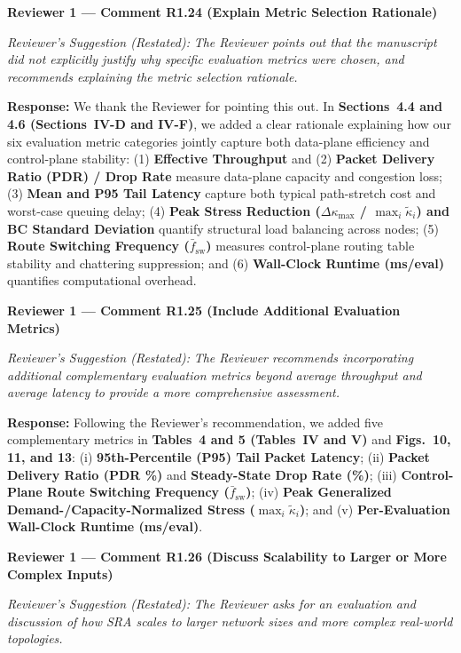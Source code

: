 \documentclass[11pt,a4paper]{article}
\newcommand{\cbox}[2]{%
  \vspace{0.6em}\noindent\textbf{#1}\par\smallskip
  \noindent\textit{Reviewer's Suggestion (Restated):} \textit{#2}\par\smallskip
}
\begin{document}
\hrulefill

\cbox{Reviewer 1 --- Comment R1.24 (Explain Metric Selection Rationale)}{The Reviewer points out that the manuscript did not explicitly justify why specific evaluation metrics were chosen, and recommends explaining the metric selection rationale.}

\noindent\textbf{Response:} We thank the Reviewer for pointing this out. In \textbf{Sections~4.4 and 4.6 (Sections~IV-D and IV-F)}, we added a clear rationale explaining how our six evaluation metric categories jointly capture both data-plane efficiency and control-plane stability: (1) \textbf{Effective Throughput} and (2) \textbf{Packet Delivery Ratio (PDR) / Drop Rate} measure data-plane capacity and congestion loss; (3) \textbf{Mean and P95 Tail Latency} capture both typical path-stretch cost and worst-case queuing delay; (4) \textbf{Peak Stress Reduction ($\Delta\kappa_{\max}$ / $\max_i\widetilde{\kappa}_i$) and BC Standard Deviation} quantify structural load balancing across nodes; (5) \textbf{Route Switching Frequency ($\bar{f}_{\text{sw}}$)} measures control-plane routing table stability and chattering suppression; and (6) \textbf{Wall-Clock Runtime (ms/eval)} quantifies computational overhead.

\hrulefill

\cbox{Reviewer 1 --- Comment R1.25 (Include Additional Evaluation Metrics)}{The Reviewer recommends incorporating additional complementary evaluation metrics beyond average throughput and average latency to provide a more comprehensive assessment.}

\noindent\textbf{Response:} Following the Reviewer's recommendation, we added five complementary metrics in \textbf{Tables~4 and 5 (Tables~IV and V)} and \textbf{Figs.~10, 11, and 13}: (i) \textbf{95th-Percentile (P95) Tail Packet Latency}; (ii) \textbf{Packet Delivery Ratio (PDR \%)} and \textbf{Steady-State Drop Rate (\%)}; (iii) \textbf{Control-Plane Route Switching Frequency ($\bar{f}_{\text{sw}}$)}; (iv) \textbf{Peak Generalized Demand-/Capacity-Normalized Stress ($\max_i\widetilde{\kappa}_i$)}; and (v) \textbf{Per-Evaluation Wall-Clock Runtime (ms/eval)}.

\hrulefill

\cbox{Reviewer 1 --- Comment R1.26 (Discuss Scalability to Larger or More Complex Inputs)}{The Reviewer asks for an evaluation and discussion of how SRA scales to larger network sizes and more complex real-world topologies.}
\end{document}
